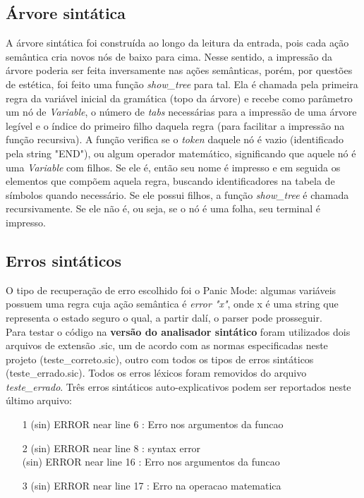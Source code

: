\documentclass[12pt]{article}
\begin{document}
\subsection{Árvore sintática}
\indent A árvore sintática foi construída ao longo da leitura da entrada, pois cada ação semântica cria novos nós de baixo para cima. Nesse sentido, a impressão da árvore poderia ser feita inversamente nas ações semânticas, porém, por questões de estética, foi feito uma função \textit{show\_tree} para tal. Ela é chamada pela primeira regra da variável inicial da gramática (topo da árvore) e recebe como parâmetro um nó de \textit{Variable}, o número de \textit{tabs} necessárias para a impressão de uma árvore legível e o índice do primeiro filho daquela regra (para facilitar a impressão na função recursiva). A função verifica se o \textit{token} daquele nó é vazio (identificado pela string "END"), ou algum operador matemático, significando que aquele nó é uma \textit{Variable} com filhos. Se ele é, então seu nome é impresso e em seguida os elementos que compõem aquela regra, buscando identificadores na tabela de símbolos quando necessário. Se ele possui filhos, a função \textit{show\_tree} é chamada recursivamente. Se ele não é, ou seja, se o nó é uma folha,  seu terminal é impresso.

\subsection{Erros sintáticos}

\indent O tipo de recuperação de erro escolhido foi o Panic Mode: algumas variáveis possuem uma regra cuja ação semântica é \textit{error "x"}, onde x é uma string que representa o estado seguro o qual, a partir dalí, o parser pode prosseguir. \\
\indent Para testar o código na \textbf{versão do analisador sintático} foram utilizados dois arquivos de extensão .sic, um de acordo com as normas especificadas neste projeto (teste\_correto.sic), outro com todos os tipos de erros sintáticos (teste\_errado.sic). Todos os erros léxicos foram removidos do arquivo \textit{teste\_errado}. Três erros sintáticos auto-explicativos podem ser reportados neste último arquivo:
\begin{itemize}
  \item[1] (sin) ERROR near line 6 : Erro nos argumentos da funcao
  \item[2] (sin) ERROR near line 8 : syntax error \\ (sin) ERROR near line 16 : Erro nos argumentos da funcao
  \item[3] (sin) ERROR near line 17 : Erro na operacao matematica
\end{itemize}
\end{document}
